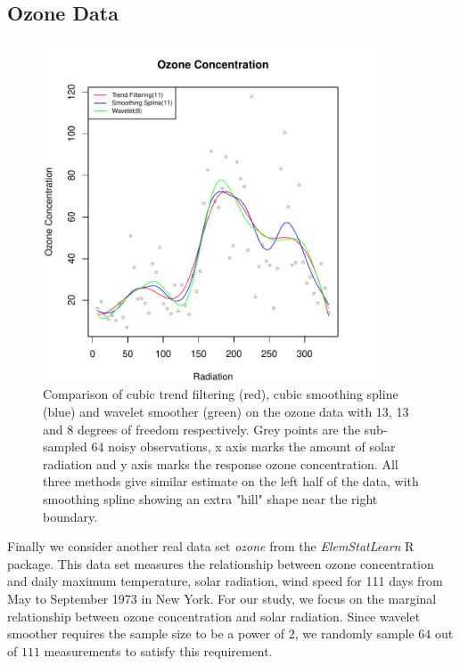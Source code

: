 \documentclass[a4paper]{article}
\begin{document}
\subsection{Ozone Data}
\label{subsec:real_ozone}

\begin{figure}[t!]
\centering
\includegraphics[width = 0.9\textwidth]{Figures/Figure9c.pdf}
\caption{Comparison of cubic trend filtering (red), cubic smoothing spline (blue) and wavelet smoother (green) on the ozone data with 13, 13 and 8 degrees of freedom respectively. Grey points are the sub-sampled $64$ noisy observations, x axis marks the amount of solar radiation and y axis marks the response ozone concentration. All three methods give similar estimate on the left half of the data, with smoothing spline showing an extra "hill" shape near the right boundary.}
\label{fig:real_ozone}
\end{figure}

Finally we consider another real data set \textit{ozone} from the \textit{ElemStatLearn} R package. This data set measures the relationship between ozone concentration and daily maximum temperature, solar radiation, wind speed for 111 days from May to September 1973 in New York. For our study, we focus on the marginal relationship between ozone concentration and solar radiation. Since wavelet smoother requires the sample size to be a power of $2$, we randomly sample $64$ out of $111$ measurements to satisfy this requirement. 
\end{document}
